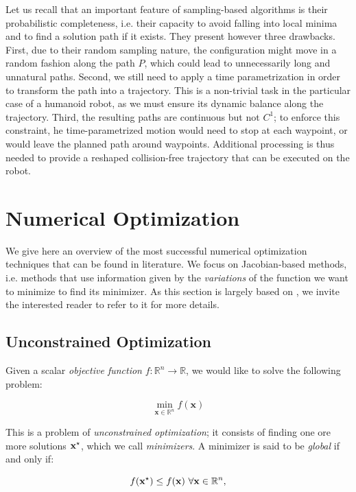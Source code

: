 Let us recall that an important feature of sampling-based algorithms
is their probabilistic completeness, i.e. their capacity to avoid
falling into local minima and to find a solution path if it
exists. They present however three drawbacks. First, due to their
random sampling nature, the configuration \config{} might move in a
random fashion along the path $P$, which could lead to unnecessarily
long and unnatural paths. Second, we still need to apply a time
parametrization in order to transform the path into a trajectory. This
is a non-trivial task in the particular case of a humanoid robot, as
we must ensure its dynamic balance along the trajectory. Third, the
resulting paths are continuous but not $C^1$; to enforce this
constraint, he time-parametrized motion would need to stop at each
waypoint, or would leave the planned path around waypoints. Additional
processing is thus needed to provide a reshaped collision-free
trajectory that can be executed on the robot.

\section{Numerical Optimization}

We give here an overview of the most successful numerical optimization
techniques that can be found in literature. We focus on Jacobian-based
methods, i.e. methods that use information given by the
\emph{variations} of the function we want to minimize to find its
minimizer. As this section is largely based on
\cite{nocedal1999numerical}, we invite the interested reader to refer
to it for more details.

\subsection{Unconstrained Optimization}

Given a scalar \emph{objective function} $f:\mathbb R^n \rightarrow
\mathbb R$, we would like to solve the following problem:

\begin{equation}
\min_{\mathbf{x}\in\mathbb R^n}f(\mathbf{x})
\end{equation}

This is a problem of \emph{unconstrained optimization}; it consists of
finding one ore more solutions $\mathbf{x}^{\star}$, which we call
\emph{minimizers}. A minimizer is said to be \emph{global} if and only
if:

\begin{equation}
f(\mathbf{x}^{\star}) \le f(\mathbf{x})~\forall \mathbf{x} \in \mathbb R^n,
\end{equation}

